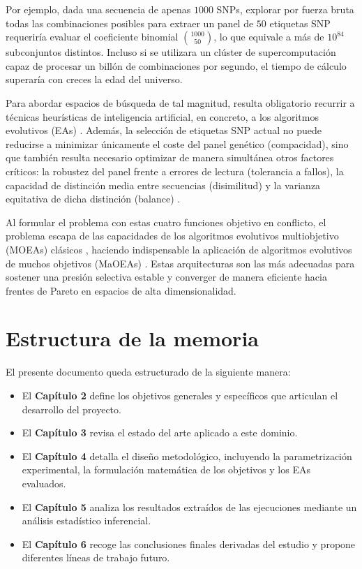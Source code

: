 Por ejemplo, dada una secuencia de apenas $1000$ SNPs, explorar por fuerza bruta todas las combinaciones posibles para extraer un panel de $50$ etiquetas SNP requeriría evaluar el coeficiente binomial $\binom{1000}{50}$, lo que equivale a más de $10^{84}$ subconjuntos distintos. Incluso si se utilizara un clúster de supercomputación capaz de procesar un billón de combinaciones por segundo, el tiempo de cálculo superaría con creces la edad del universo.

Para abordar espacios de búsqueda de tal magnitud, resulta obligatorio recurrir a técnicas heurísticas de inteligencia artificial, en concreto, a los algoritmos evolutivos (EAs) \cite{ting2010multi}. Además, la selección de etiquetas SNP actual no puede reducirse a minimizar únicamente el coste del panel genético (compacidad), sino que también resulta necesario optimizar de manera simultánea otros factores críticos: la robustez del panel frente a errores de lectura (tolerancia a fallos), la capacidad de distinción media entre secuencias (disimilitud) y la varianza equitativa de dicha distinción (balance) \cite{ting2010multi, moqa2022assessing}.

Al formular el problema con estas cuatro funciones objetivo en conflicto, el problema escapa de las capacidades de los algoritmos evolutivos multiobjetivo (MOEAs) clásicos \cite{ishibuchi2008evolutionary}, haciendo indispensable la aplicación de algoritmos evolutivos de muchos objetivos (MaOEAs) \cite{moqa2022assessing}. Estas arquitecturas son las más adecuadas para sostener una presión selectiva estable y converger de manera eficiente hacia frentes de Pareto en espacios de alta dimensionalidad.

\section{Estructura de la memoria}

El presente documento queda estructurado de la siguiente manera:
\begin{itemize}
    \item El \textbf{Capítulo 2} define los objetivos generales y específicos que articulan el desarrollo del proyecto.
    \item El \textbf{Capítulo 3} revisa el estado del arte aplicado a este dominio.
    \item El \textbf{Capítulo 4} detalla el diseño metodológico, incluyendo la parametrización experimental, la formulación matemática de los objetivos y los EAs evaluados.
    \item El \textbf{Capítulo 5} analiza los resultados extraídos de las ejecuciones mediante un análisis estadístico inferencial.
    \item El \textbf{Capítulo 6} recoge las conclusiones finales derivadas del estudio y propone diferentes líneas de trabajo futuro.
\end{itemize}